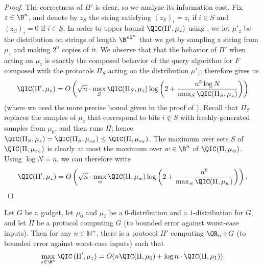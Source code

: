 \begin{proof}
The correctness of $\Pi'$ is clear, so we analyze its information cost.
Fix $z\in\B^n$, and denote by $z_S$ the string satisfying
$(z_S)_i=z_i$ if $i\in S$ and $(z_S)_i=0$ if $i\in S$.
In order to upper bound $\QIC(\Pi',\mu_z)$ using ,
we let $\mu'_z$ be the distribution on strings of length
$\B^{n 2^n}$ that we get by sampling a string from $\mu_z$
and making $2^n$ copies of it.
We observe that that the behavior of $\Pi'$ when acting on $\mu_z$
is exactly the composed behavior of the query algorithm for $F$
composed with the protocols $\Pi_S$ acting on the distribution
$\mu'_z$;  therefore gives us
\[\QIC(\Pi',\mu_z)=O\left(\sqrt{n}\cdot
\max_S\QIC(\Pi_S,\mu_z)
\log\left(2+\frac{n^5\log N}{\max_S\QIC(\Pi_S,\mu_z)}\right)\right)\]
(where we used the more precise bound given in the proof
of ).
Recall that $\Pi_S$ replaces the samples of $\mu_z$
that correspond to bits $i\notin S$ with freshly-generated
samples from $\mu_0$, and then runs $\Pi$; hence
$\QIC(\Pi_S,\mu_z)=\QIC(\Pi_S,\mu_{z_S})\le \QIC(\Pi,\mu_{z_S})$.
The maximum over sets $S$ of $\QIC(\Pi,\mu_{z_S})$
is clearly at most the maximum over $w\in\B^n$ of $\QIC(\Pi,\mu_w)$.
Using $\log N=n$, we can therefore write
\[\QIC(\Pi',\mu_z)=O\left(\sqrt{n}\cdot
\max_w\QIC(\Pi,\mu_w)
\log\left(2+\frac{n^6}{\max_w\QIC(\Pi,\mu_w)}\right)\right).\qedhere\]
\end{proof}

\begin{lemma}\label{lem:OR_protocol}
Let $G$ be a gadget, let $\mu_0$ and $\mu_1$ be a $0$-distribution
and a $1$-distribution for $G$, and let $\Pi$ be a protocol
computing $G$ (to bounded error against worst-case inputs).
Then for any $n\in\mathbb{N}^+$, there is a protocol $\Pi'$
computing $\OR_n\circ G$ (to bounded error against worst-case inputs)
such that
\[\max_{z\in\B^n}\QIC\left(\Pi',\mu_z\right)
=O(n\QIC(\Pi,\mu_0)+\log n\cdot \QIC(\Pi,\mu_1)).\]
\end{lemma}

